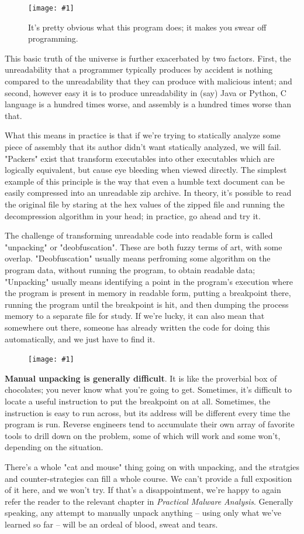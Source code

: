 \documentclass{article}
\newcommand{\wrapimageleftcap}[2] {\begin{figure}\begin{center}\texttt{[image: \#1]}\end{center}\caption{#2}\end{figure}
}
\newcommand{\wrapimageright}[1] {
    \begin{figure}
        \begin{center}
            \texttt{[image: \#1]} 
        \end{center}
    \end{figure}
}
\begin{document}
\wrapimageleftcap{./images/obfuscated_code.png}{It's pretty obvious what this program does; it makes you swear off programming.}
This basic truth of the universe is further exacerbated by two factors. First, the unreadability that a programmer typically produces by accident is nothing compared to the unreadability that they can produce with malicious intent; and second, however easy it is to produce unreadability in (say) Java or Python, C language is a hundred times worse, and assembly is a hundred times worse than that.

What this means in practice is that if we're trying to statically analyze some piece of assembly that its author didn't want statically analyzed, we will fail. "Packers" exist that transform executables into other executables which are logically equivalent, but cause eye bleeding when viewed directly. The simplest example of this principle is the way that even a humble text document can be easily compressed into an unreadable zip archive. In theory, it's possible to read the original file by staring at the hex values of the zipped file and running the decompression algorithm in your head; in practice, go ahead and try it.

The challenge of transforming unreadable code into readable form is called "unpacking" or "deobfuscation". These are both fuzzy terms of art, with some overlap. "Deobfuscation" usually means perfroming some algorithm on the program data, without running the program, to obtain readable data; "Unpacking" usually means identifying a point in the program's execution where the program is present in memory in readable form, putting a breakpoint there, running the program until the breakpoint is hit, and then dumping the process memory to a separate file for study. If we're lucky, it can also mean that somewhere out there, someone has already written the code for doing this automatically, and we just have to find it.

\wrapimageright{./images/pma.jpg}
\textbf{Manual unpacking is generally difficult}. It is like the proverbial box of chocolates; you never know what you're going to get. Sometimes, it's difficult to locate a useful instruction to put the breakpoint on at all. Sometimes, the instruction is easy to run across, but its address will be different every time the program is run. Reverse engineers tend to accumulate their own array of favorite tools to drill down on the problem, some of which will work and some won't, depending on the situation.

There's a whole "cat and mouse" thing going on with unpacking, and the stratgies and counter-strategies can fill a whole course. We can't provide a full exposition of it here, and we won't try. If that's a disappointment, we're happy to again refer the reader to the relevant chapter in \textit{Practical Malware Analysis}. Generally speaking, any attempt to manually unpack anything -- using only what we've learned so far -- will be an ordeal of blood, sweat and tears. 
\end{document}
